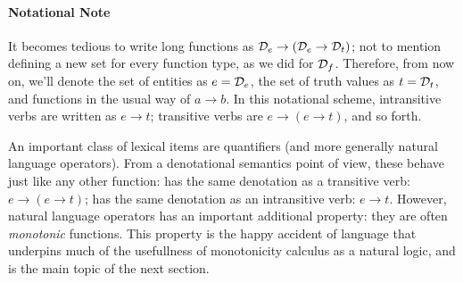 \paragraph{Notational Note}
It becomes tedious to write long functions as $\mathcal{D}_e \rightarrow (\mathcal{D}_e \rightarrow \mathcal{D}_t)$;
  not to mention defining a new set for every function type, as we did for $\mathcal{D}_f$.
Therefore, from now on, we'll denote the set of entities as $e = \mathcal{D}_e$, the set of truth values as 
  $t = \mathcal{D}_t$, and functions in the usual way of $a \rightarrow b$.
In this notational scheme, intransitive verbs are written as $e \rightarrow t$; transitive
  verbs are $e \rightarrow (e \rightarrow t)$, and so forth.



An important class of lexical items are quantifiers (and more generally natural language
  operators).
From a denotational semantics point of view, these behave just like any other function:
   has the same denotation as a transitive verb: $e \rightarrow (e \rightarrow t)$;
   has the same denotation as an intransitive verb: $e \rightarrow t$.
However, natural language operators has an important additional property: they are often
  \textit{monotonic} functions.
This property is the happy accident of language that underpins much of the usefullness
  of monotonicity calculus as a natural logic, and is the main topic of the next section.






